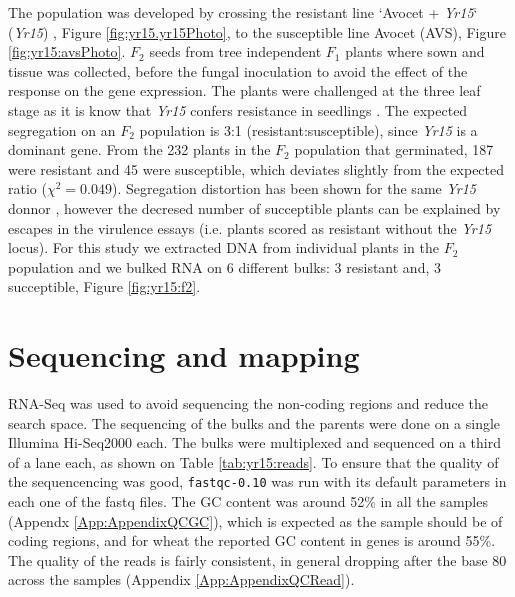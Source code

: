 The population was developed by crossing the resistant line `Avocet + \textit{Yr15}` (\textit{Yr15}) \citep{Wellings1998}, Figure \ref{fig:yr15.yr15Photo}, to the susceptible line Avocet (AVS), Figure \ref{fig:yr15:avsPhoto}. 
$F_{2}$ seeds from tree independent $F_{1}$ plants where sown and tissue was collected, before the fungal inoculation to avoid the effect of the response on the gene expression.  
The plants were challenged at the three leaf stage as it is know that \textit{Yr15} confers resistance in seedlings \citep{Gerechter-Amitai1989}.
The expected segregation on an $F_{2}$ population is 3:1 (resistant:susceptible), since \textit{Yr15} is a dominant gene.
From the 232 plants in the $F_{2}$ population that germinated, 187 were resistant and 45 were susceptible, which deviates slightly from the expected ratio ($\chi^{2}=0.049$).
Segregation distortion has been shown for the same \textit{Yr15} donnor \citep{Randhawa2009}, however the decresed number of succeptible plants can be explained by escapes in the virulence essays (i.e. plants scored as resistant without the \textit{Yr15} locus).   For this study we extracted DNA from individual plants in the $F_{2}$ population and we bulked RNA on 6 different bulks: 3 resistant and, 3 succeptible, Figure \ref{fig:yr15:f2}. 

\section{Sequencing and mapping} 

RNA-Seq was used to avoid sequencing the non-coding regions and reduce the search space.  
The sequencing of the bulks and the parents were done on a single Illumina Hi-Seq2000 each.
The bulks were multiplexed and sequenced on a third of a lane each, as shown on Table \ref{tab:yr15:reads}. 
To ensure that the quality of the sequencencing was good, \verb|fastqc-0.10| \citep{fastqc}  was run with its default parameters in each one of the fastq files.  
The GC content was around 52\% in all the samples (Appendx \ref{App:AppendixQCGC}), which is expected as the sample should be of coding regions, and for wheat the reported GC content in genes is around 55\%.  
The quality of the reads is fairly consistent, in general dropping after the base 80 across the samples (Appendix \ref{App:AppendixQCRead}). 


